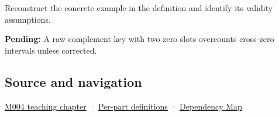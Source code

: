 Reconstruct the concrete example in the definition and identify its validity assumptions.

\textbf{Pending:} A raw complement key with two zero slots overcounts cross-zero intervals unless corrected.

\subsection{Source and navigation}\label{appendix-deca299ae4b8-source-and-navigation}

\hyperref[01-foundations-i-ch001-a-stretching-ruler-for-real-valued-quantities]{M004 teaching chapter} · \hyperref[appendix-fd090d982a15-m004---parts-61-76]{Per-part definitions} · \hyperref[appendix-4ad47bdd269a]{Dependency Map}
